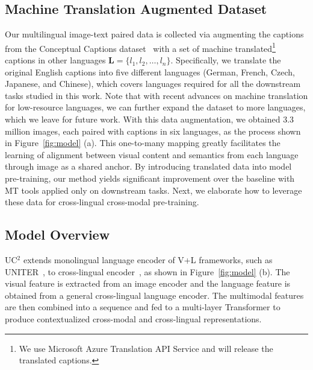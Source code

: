 \documentclass[final]{cvpr}
\newcommand{\shuo}[1]{\textcolor{blue}{\small{\bf [Shuo: #1 ]}}}
\newcommand{\luowei}[1]{\textcolor{cyan}{\small{\bf [Luowei: #1 ]}}}
\newcommand{\yu}[1]{\textcolor{green}{\small{\bf [Yu: #1 ]}}}
\newcommand{\ucns}{cross-lingual cross-modal pre-training}
\begin{document}
\subsection{Machine Translation Augmented Dataset}
Our multilingual image-text paired data is collected via augmenting the captions
from the Conceptual Captions dataset~\cite{conceptual-caption} with a set of machine translated\footnote{We use Microsoft Azure Translation API Service and will release the translated captions.} captions in other languages $\boldsymbol{L} = \{l_1, l_2, \dots, l_n\}$.
Specifically, we translate the original English captions into five different languages (German, French, Czech, Japanese, and Chinese), which covers languages required for all the downstream tasks studied in this work. Note that with recent advances on machine translation for low-resource languages, we can further expand the dataset to more languages, which we leave for future work. With this data augmentation, we obtained 3.3 million images, each paired with captions in six languages, as the process shown in Figure~\ref{fig:model} (a). %
This one-to-many mapping greatly facilitates the learning of alignment between visual content and semantics from each language through image as a shared anchor. 
By introducing translated data into model pre-training, our method yields significant improvement over the baseline with MT tools applied only on downstream tasks.
Next, we elaborate how to leverage these data for \ucns. 

\subsection{Model Overview}
UC$^2$ extends monolingual language encoder of V+L frameworks, such as UNITER~\cite{UNITER}, to cross-lingual encoder~\cite{XLMR}, as shown in Figure~\ref{fig:model} (b).   
 The visual feature is extracted from an image encoder and the language feature is obtained from a general cross-lingual language encoder.
The multimodal features are then combined into a sequence and fed to a multi-layer Transformer to produce contextualized cross-modal and cross-lingual representations. 
\end{document}
